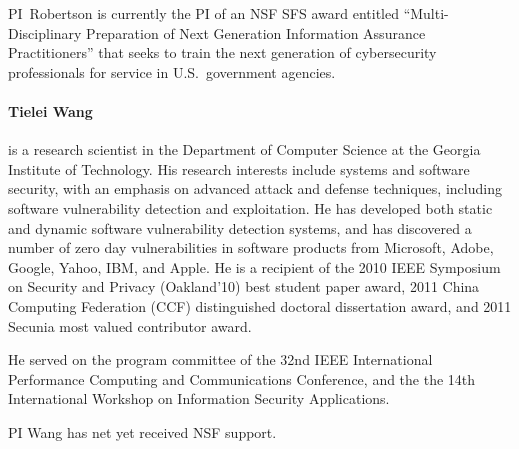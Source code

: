 \documentclass[letterpaper,twoside,11pt,headings=small]{scrartcl}
\begin{document}
PI~Robertson is currently the PI of an NSF SFS award entitled
``Multi-Disciplinary Preparation of Next Generation Information Assurance Practitioners''
that seeks to train the next generation of cybersecurity professionals for
service in U.S.~government agencies.

\paragraph{Tielei Wang} is a research scientist in the Department of Computer
Science at the Georgia Institute of Technology.  His research interests include
systems and software security, with an emphasis on advanced attack and defense
techniques, including software vulnerability detection and exploitation.  He
has developed both static and dynamic software vulnerability detection systems,
and has discovered a number of zero day vulnerabilities in software products
from Microsoft, Adobe, Google, Yahoo, IBM, and Apple.  He is a recipient of
the 2010 IEEE Symposium on Security and Privacy (Oakland'10) best student
paper award, 2011 China Computing Federation (CCF) distinguished doctoral
dissertation award, and 2011 Secunia most valued contributor award.

He served on the program committee of the 32nd IEEE International Performance
Computing and Communications Conference, and the the 14th International
Workshop on Information Security Applications.

PI Wang has net yet received NSF support.

\newpage
{}
\setcounter{page}{1}
\setcounter{section}{0}



\end{document}

